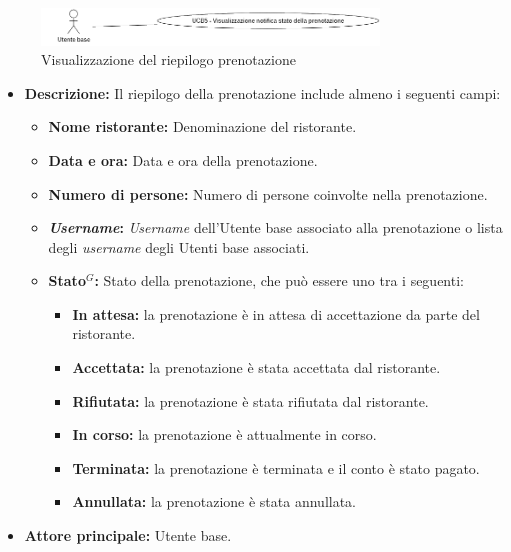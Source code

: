 \newpage
{}
\label{usecase:Visualizzazione del riepilogo prenotazione}

\begin{figure}[h]
	\centering
	\includegraphics[width=0.8\textwidth]{./uml/UCB5.png} 
	\caption{Visualizzazione del riepilogo prenotazione}
	\label{fig:UCB5}
  \end{figure}

\begin{itemize}
	\item \textbf{Descrizione:}
	Il riepilogo della prenotazione include almeno i seguenti campi:
	\begin{itemize}
		\item \textbf{Nome ristorante:} Denominazione del ristorante.
		\item \textbf{Data e ora:} Data e ora della prenotazione.
		\item \textbf{Numero di persone:} Numero di persone coinvolte nella prenotazione.
		\item \textbf{\textit{Username}:} \textit{Username} dell'Utente base associato alla prenotazione o lista degli \textit{username} degli Utenti base associati.

		\item \textbf{Stato$^G$:} Stato della prenotazione, che può essere uno tra i seguenti:
			  \begin{itemize}
				  \item \textbf{In attesa:} la prenotazione è in attesa di accettazione da parte del ristorante.
				  \item \textbf{Accettata:} la prenotazione è stata accettata dal ristorante.
				  \item \textbf{Rifiutata:} la prenotazione è stata rifiutata dal ristorante.
				  \item \textbf{In corso:} la prenotazione è attualmente in corso.
				  \item \textbf{Terminata:} la prenotazione è terminata e il conto è stato pagato.
				  \item \textbf{Annullata:} la prenotazione è stata annullata.
			  \end{itemize}
	\end{itemize}
	
	\item \textbf{Attore principale:} Utente base.


\end{itemize}
